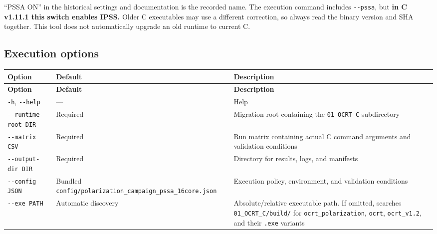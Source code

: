 “PSSA ON” in the historical settings and documentation is the recorded name. The execution command includes \texttt{-\allowbreak{}-\allowbreak{}pssa}, but \textbf{in C v1.11.1 this switch enables IPSS.} Older C executables may use a different correction, so always read the binary version and SHA together. This tool does not automatically upgrade an old runtime to current C.

\subsection{Execution options}
\label{sec:auto:06_python_batch:10.1}

{\TableFont
\begin{longtable}{@{}>{\raggedright\arraybackslash}p{}>{\raggedright\arraybackslash}p{}>{\raggedright\arraybackslash}p{}@{}}
\toprule
\textbf{Option} & \textbf{Default} & \textbf{Description} \\
\midrule
\endfirsthead
\toprule
\textbf{Option} & \textbf{Default} & \textbf{Description} \\
\midrule
\endhead
\bottomrule
\endfoot
\texttt{-\allowbreak{}h}, \texttt{-\allowbreak{}-\allowbreak{}help} & --- & Help \\
\texttt{-\allowbreak{}-\allowbreak{}runtime-\allowbreak{}root DIR} & Required & Migration root containing the \texttt{01\_\allowbreak{}OCRT\_\allowbreak{}C} subdirectory \\
\texttt{-\allowbreak{}-\allowbreak{}matrix CSV} & Required & Run matrix containing actual C command arguments and validation conditions \\
\texttt{-\allowbreak{}-\allowbreak{}output-\allowbreak{}dir DIR} & Required & Directory for results, logs, and manifests \\
\texttt{-\allowbreak{}-\allowbreak{}config JSON} & Bundled \texttt{config/\allowbreak{}polarization\_\allowbreak{}campaign\_\allowbreak{}pssa\_\allowbreak{}16core.\allowbreak{}json} & Execution policy, environment, and validation conditions \\
\texttt{-\allowbreak{}-\allowbreak{}exe PATH} & Automatic discovery & Absolute/relative executable path. If omitted, searches \texttt{01\_\allowbreak{}OCRT\_\allowbreak{}C/\allowbreak{}build/\allowbreak{}} for \texttt{ocrt\_\allowbreak{}polarization}, \texttt{ocrt}, \texttt{ocrt\_\allowbreak{}v1.\allowbreak{}2}, and their \texttt{.\allowbreak{}exe} variants \\

\end{longtable}}
